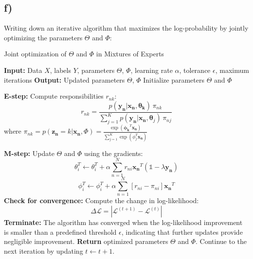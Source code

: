 \documentclass[12pt,a4paper,oneside]{paper}
\begin{document}
\subsection*{f)}

Writing down an iterative algorithm that maximizes the log-probability by jointly optimizing the parameters $\Theta$ and $\Phi$:


\begin{algorithm}
    \caption{Joint optimization of \( \Theta \) and \( \Phi \) in Mixtures of Experts}
    \begin{algorithmic}
        \State \textbf{Input:} Data \( X \), labels \( Y \), parameters \( \Theta \), \( \Phi \), learning rate \( \alpha \), tolerance \( \epsilon \), maximum iterations
        \State \textbf{Output:} Updated parameters \( \Theta \), \( \Phi \)
        \State Initialize parameters \( \Theta \) and \( \Phi \)
        
            \State \textbf{E-step:} Compute responsibilities \( r_{nk} \):
            \[
            r_{nk} = \frac{p(\bm{y_n} | \bm{x_n}, \bm{\theta_k}) \, \pi_{nk}}{\sum_{j=1}^{K} p(\bm{y_n} | \bm{x_n}, \bm{\theta}_j) \, \pi_{nj}}
            \]
            where \( \pi_{nk} = p(\bm{z_n} = k | \bm{x_n}, \Phi) = \frac{\exp(\bm{\phi_k}^T \bm{x_n})}{\sum_{j=1}^{K} \exp(\phi_j^T \bm{x_n})} \)
            
            \State \textbf{M-step:} Update \( \Theta \) and \( \Phi \) using the gradients:
            \[
            \theta_i^T \leftarrow \theta_i^T + \alpha \sum_{n=1}^{N} r_{ni} \bm{x_n}^T \left( \mathds{1} - \lambda \bm{y_n} \right) 
            \]
            \[
            \phi_i^T \leftarrow \phi_i^T + \alpha \sum_{n=1}^{N} \left[ r_{ni} - \pi_{ni} \right] \bm{x_n}^T
            \]
            \State \textbf{Check for convergence:} 
            \State \quad Compute the change in log-likelihood:
            \[
            \Delta \mathcal{L} = \left| \mathcal{L}^{(t+1)} - \mathcal{L}^{(t)} \right|
            \]
                \State \textbf{Terminate:} The algorithm has converged when the log-likelihood improvement is smaller than a predefined threshold \( \epsilon \), indicating that further updates provide negligible improvement.
                \State \quad \textbf{Return} optimized parameters \( \Theta \) and \( \Phi \).
            \Else
                \State \quad Continue to the next iteration by updating \( t \leftarrow t + 1 \).
            \EndIf
        \EndWhile
    \end{algorithmic}
\end{algorithm}
\end{document}
